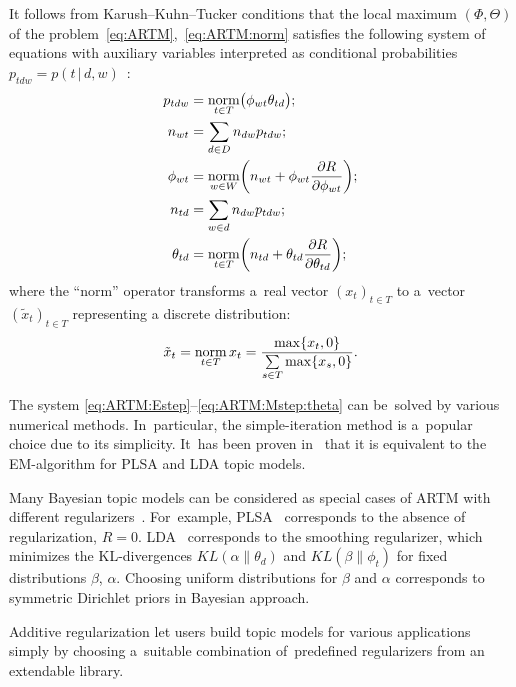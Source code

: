\documentclass{sig-alternate-2013}
\newcommand{\norm}{\mathop{\rm norm}\limits}
\newcommand{\cond}{\mspace{3mu}{|}\mspace{3mu}}
\begin{document}
It follows from Karush--Kuhn--Tucker conditions
that the \mbox{local} maximum $(\Phi,\Theta)$
of the problem~\eqref{eq:ARTM},~\eqref{eq:ARTM:norm}
satisfies the following system of equations
with auxiliary variables interpreted as conditional probabilities
${p_{tdw} = p(t\cond d,w)}$~\cite{voron14aist}:
\begin{align}
    \label{eq:ARTM:Estep}
    p_{tdw} &= \norm_{t\in T} \bigl(\phi_{wt}\theta_{td}\bigr);
\\\notag    
    n_{wt} &= \sum_{d\in D} n_{dw} p_{tdw};
\\\label{eq:ARTM:Mstep:phi}
    \phi_{wt} &= \norm_{w\in W}
        \biggl(
            n_{wt} + \phi_{wt} \frac{\partial R}{\partial \phi_{wt}}
        \biggr);
\\\notag
    n_{td} &= \sum_{w\in d} n_{dw} p_{tdw};
\\\label{eq:ARTM:Mstep:theta}
    \theta_{td} &= \norm_{t\in T}
        \biggl(
            n_{td} + \theta_{td} \frac{\partial R}{\partial \theta_{td}}
        \biggr);
\end{align}
where the ``norm'' operator transforms
a~real vector $(x_t)_{t\in T}$ to
a~vector $(\tilde x_t)_{t\in T}$ representing a discrete distribution:
\[
    \tilde x_t = \norm_{t\in T} x_t = \frac{\max\{x_t,0\}}{\sum\limits_{s\in T} \max\{x_s,0\}}.
\]

The system \eqref{eq:ARTM:Estep}--\eqref{eq:ARTM:Mstep:theta}
can be~solved by various numerical methods.
In~particular, the simple-iteration method is a~popular choice due to its simplicity.
It~has been proven in~\cite{voron14mlj} that
it is equivalent to the EM-algorithm for PLSA and LDA topic models.

Many Bayesian topic models can be considered
as special cases of ARTM with different regularizers~\cite{voron14aist,voron14mlj}.
For~example,
PLSA~\cite{hofmann99plsi} corresponds to the absence of regularization, ${R=0}$.
LDA~\cite{blei03latent} corresponds to the smoothing regularizer,
which minimizes the KL-divergences
$KL(\alpha\|\theta_d)$ and
$KL(\beta\|\phi_t)$
for fixed distributions $\beta$, $\alpha$.
Choosing uniform distributions for $\beta$ and $\alpha$
corresponds to symmetric Dirichlet priors in Bayesian approach.

Additive regularization let users build topic models for various applications
simply by choosing a~suitable combination of~predefined regularizers
from an extendable \mbox{library}.
\end{document}
